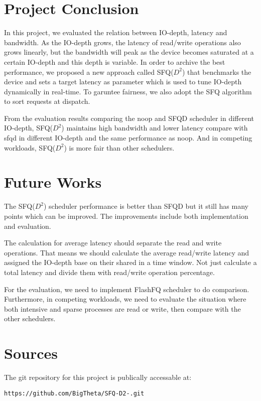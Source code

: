 \section{Project Conclusion}

In this project, we evaluated the relation between IO-depth, latency
and bandwidth.  As the IO-depth grows, the latency of read/write
operations also grows linearly, but the bandwidth will peak as the
device becomes saturated at a certain IO-depth and this depth is
variable. In order to archive the best performance, we proposed a new
approach called SFQ($D^2$) that benchmarks the device and sets a
target latency as parameter which is used to tune IO-depth dynamically
in real-time. To garuntee fairness, we also adopt the SFQ algorithm to
sort requests at dispatch.

From the evaluation results comparing the noop and SFQD scheduler in
different IO-depth, SFQ($D^2$) maintains high bandwidth and lower
latency compare with sfqd in different IO-depth and the same
performance as noop. And in competing workloads, SFQ($D^2$) is more
fair than other schedulers.

\section{Future Works}

The SFQ($D^2$) scheduler performance is better than SFQD but it still
has many points which can be improved. The improvements include both
implementation and evaluation.

The calculation for average latency should separate the read and write
operations. That means we should calculate the average read/write
latency and assigned the IO-depth base on their shared in a time
window.  Not just calculate a total latency and divide them with
read/write operation percentage.

For the evaluation, we need to implement FlashFQ scheduler to do
comparison. Furthermore, in competing workloads, we need to evaluate
the situation where both intensive and sparse processes are read or
write, then compare with the other schedulers.

\section{Sources}

The git repository for this project is publically accessable at:


\centering \verb+https://github.com/BigTheta/SFQ-D2-.git+

